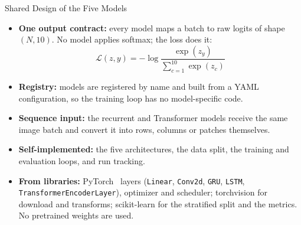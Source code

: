 \begin{frame}{Shared Design of the Five Models}
\small
\begin{itemize}
    \item \textbf{One output contract:} every model maps a batch to raw logits of shape $(N, 10)$.
          No model applies softmax; the loss does it:
          \[
              \mathcal{L}(z, y) = -\log \frac{\exp(z_y)}{\sum_{c=1}^{10} \exp(z_c)}
          \]
    \item \textbf{Registry:} models are registered by name and built from a YAML configuration,
          so the training loop has no model-specific code.
    \item \textbf{Sequence input:} the recurrent and Transformer models receive the same image batch and convert it
          into rows, columns or patches themselves.
    \item \textbf{Self-implemented:} the five architectures, the data split, the training and evaluation loops,
          and run tracking.
    \item \textbf{From libraries:} PyTorch~\cite{paszke2019pytorch} layers (\texttt{Linear}, \texttt{Conv2d}, \texttt{GRU},
          \texttt{LSTM}, \texttt{TransformerEncoderLayer}), optimizer and scheduler; torchvision for download and transforms;
          scikit-learn for the stratified split and the metrics. No pretrained weights are used.
\end{itemize}
\end{frame}


